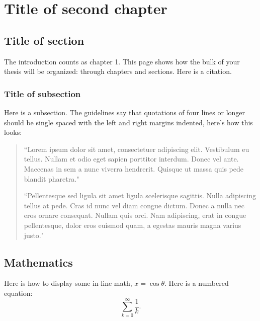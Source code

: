 \chapter{Title of second chapter}
	\label{CH_02}

\section{Title of section}
The introduction counts as chapter 1.  This page shows how the bulk of your thesis will be organized: through chapters and sections. Here is a citation.\cite{OBTMBD01}

\subsection{Title of subsection}
Here is a subsection.  The guidelines say that quotations of four lines or longer should be single spaced with the left and right margins indented, here's how this looks:\par

\singlespacing
\begin{quotation}
``Lorem ipsum dolor sit amet, consectetuer adipiscing elit. Vestibulum eu tellus. Nullam et odio eget sapien porttitor interdum. Donec vel ante. Maecenas in sem a nunc viverra hendrerit. Quisque ut massa quis pede blandit pharetra." \par
``Pellentesque sed ligula sit amet ligula scelerisque sagittis. Nulla adipiscing tellus at pede. Cras id nunc vel diam congue dictum. Donec a nulla nec eros ornare consequat. Nullam quis orci. Nam adipiscing, erat in congue pellentesque, dolor eros euismod quam, a egestas mauris magna varius justo."
\end{quotation}
\doublespacing

\section{Mathematics}
Here is how to display some in-line math, $x=\cos\theta$. Here is a numbered equation:
\begin{equation} \label{eq:01}
	\sum\limits_{k=0}^{\infty}{\frac{1}{k}}.
\end{equation}